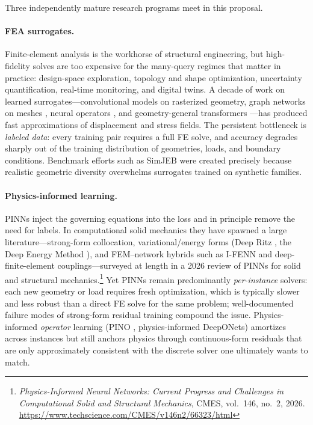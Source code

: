 \documentclass[11pt]{article}
\begin{document}
Three independently mature research programs meet in this proposal.

\paragraph{FEA surrogates.}
Finite-element analysis is the workhorse of structural engineering, but
high-fidelity solves are too expensive for the many-query regimes that matter
in practice: design-space exploration, topology and shape optimization,
uncertainty quantification, real-time monitoring, and digital twins. A decade
of work on learned surrogates---convolutional models on rasterized geometry,
graph networks on meshes \cite{pfaff2021}, neural operators
\cite{li2021fno,lu2021deeponet,kovachki2023,li2023geofno}, and
geometry-general transformers \cite{wu2024transolver}---has produced fast
approximations of displacement and stress fields. The persistent bottleneck is
\emph{labeled data}: every training pair requires a full FE solve, and
accuracy degrades sharply out of the training distribution of geometries,
loads, and boundary conditions. Benchmark efforts such as SimJEB
\cite{whalen2021simjeb} were created precisely because realistic geometric
diversity overwhelms surrogates trained on synthetic families.

\paragraph{Physics-informed learning.}
PINNs \cite{raissi2019} inject the governing equations into the loss and in
principle remove the need for labels. In computational solid mechanics they
have spawned a large literature---strong-form collocation, variational/energy
forms (Deep Ritz \cite{e2018ritz}, the Deep Energy Method
\cite{samaniego2020,nguyen2020dem}), and FEM--network hybrids such as I-FENN
\cite{pantidis2023ifenn} and deep-finite-element couplings---surveyed at
length in a 2026 review of PINNs for solid and structural
mechanics.\footnote{\emph{Physics-Informed Neural Networks: Current Progress
and Challenges in Computational Solid and Structural Mechanics}, CMES, vol.~146,
no.~2, 2026. \url{https://www.techscience.com/CMES/v146n2/66323/html}}
Yet PINNs remain predominantly \emph{per-instance} solvers: each new geometry
or load requires fresh optimization, which is typically slower and less
robust than a direct FE solve for the same problem; well-documented failure
modes of strong-form residual training \cite{krishnapriyan2021,wang2022ntk}
compound the issue. Physics-informed \emph{operator} learning (PINO
\cite{li2024pino}, physics-informed DeepONets) amortizes across instances but
still anchors physics through continuous-form residuals that are only
approximately consistent with the discrete solver one ultimately wants to
match.
\end{document}
